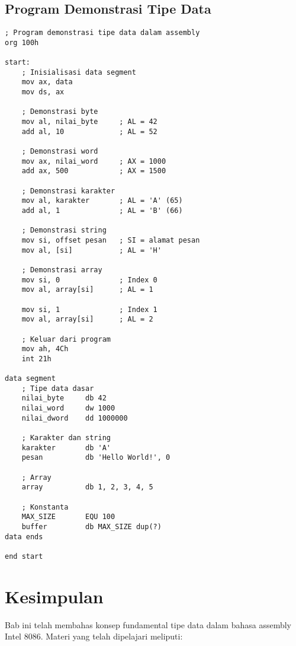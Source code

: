 \documentclass[../main.tex]{subfiles}
\begin{document}
\subsection{Program Demonstrasi Tipe Data}
\begin{lstlisting}[language={[x86masm]Assembler}, caption=Program Demonstrasi Tipe Data, label={lst:data-types-demo}]
; Program demonstrasi tipe data dalam assembly
org 100h

start:
    ; Inisialisasi data segment
    mov ax, data
    mov ds, ax
    
    ; Demonstrasi byte
    mov al, nilai_byte     ; AL = 42
    add al, 10             ; AL = 52
    
    ; Demonstrasi word
    mov ax, nilai_word     ; AX = 1000
    add ax, 500            ; AX = 1500
    
    ; Demonstrasi karakter
    mov al, karakter       ; AL = 'A' (65)
    add al, 1              ; AL = 'B' (66)
    
    ; Demonstrasi string
    mov si, offset pesan   ; SI = alamat pesan
    mov al, [si]           ; AL = 'H'
    
    ; Demonstrasi array
    mov si, 0              ; Index 0
    mov al, array[si]      ; AL = 1
    
    mov si, 1              ; Index 1
    mov al, array[si]      ; AL = 2
    
    ; Keluar dari program
    mov ah, 4Ch
    int 21h

data segment
    ; Tipe data dasar
    nilai_byte     db 42
    nilai_word     dw 1000
    nilai_dword    dd 1000000
    
    ; Karakter dan string
    karakter       db 'A'
    pesan          db 'Hello World!', 0
    
    ; Array
    array          db 1, 2, 3, 4, 5
    
    ; Konstanta
    MAX_SIZE       EQU 100
    buffer         db MAX_SIZE dup(?)
data ends

end start
\end{lstlisting}



\section{Kesimpulan}\label{sec:tipe-data-kesimpulan}
Bab ini telah membahas konsep fundamental tipe data dalam bahasa assembly Intel 8086. Materi yang telah dipelajari meliputi:
\end{document}
